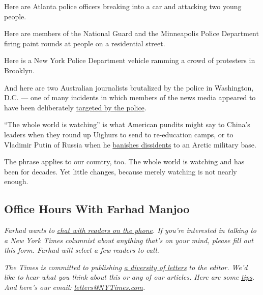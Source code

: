 Here are Atlanta police officers breaking into a car and attacking two
young people.

Here are members of the National Guard and the Minneapolis Police
Department firing paint rounds at people on a residential street.

Here is a New York Police Department vehicle ramming a crowd of
protesters in Brooklyn.

And here are two Australian journalists brutalized by the police in
Washington, D.C. --- one of many incidents in which members of the news
media appeared to have been deliberately
\href{https://www.nytimes3xbfgragh.onion/2020/06/01/business/media/reporters-protests-george-floyd.html}{targeted
by the police}.

``The whole world is watching'' is what American pundits might say to
China's leaders when they round up Uighurs to send to re-education
camps, or to Vladimir Putin of Russia when he
\href{https://www.nytimes3xbfgragh.onion/2019/12/24/world/europe/navalny-russia-putin.html}{banishes
dissidents} to an Arctic military base.

The phrase applies to our country, too. The whole world is watching and
has been for decades. Yet little changes, because merely watching is not
nearly enough.

\hypertarget{office-hours-with-farhad-manjoo}{%
\subsection{Office Hours With Farhad
Manjoo}\label{office-hours-with-farhad-manjoo}}

\emph{Farhad wants to}
\href{https://www.nytimes3xbfgragh.onion/2019/05/16/opinion/farhad-office-hours.html?module=inline}{\emph{chat
with readers on the phone}}\emph{. If you're interested in talking to a
New York Times columnist about anything that's on your mind, please fill
out this form. Farhad will select a few readers to call.}

\emph{The Times is committed to publishing}
\href{https://www.nytimes3xbfgragh.onion/2019/01/31/opinion/letters/letters-to-editor-new-york-times-women.html}{\emph{a
diversity of letters}} \emph{to the editor. We'd like to hear what you
think about this or any of our articles. Here are some}
\href{https://help.nytimes3xbfgragh.onion/hc/en-us/articles/115014925288-How-to-submit-a-letter-to-the-editor}{\emph{tips}}\emph{.
And here's our email:}
\href{mailto:letters@NYTimes.com}{\emph{letters@NYTimes.com}}\emph{.}

